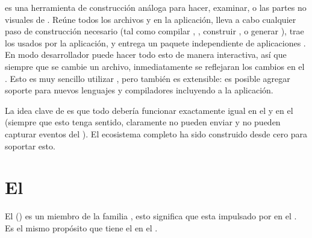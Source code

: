 \begin{itemize}
\commandLinemeteor es una herramienta de construcción análoga para hacer, examinar, o las partes no visuales de \visualstudio. Reúne todos los archivos y \assets en la aplicación, lleva a cabo cualquier paso de construcción necesario (tal como compilar \coffeescript, \minifying \cssNAME, construir \modules \npm, o generar \sourcemaps), trae los \packages usados por la aplicación, y entrega un paquete independiente de aplicaciones \readytorun. En modo desarrollador puede hacer todo esto de manera interactiva, así que siempre que se cambie un archivo, inmediatamente se reflejaran los cambios en el \browser. Esto es muy sencillo utilizar \outofthebox, pero también es extensible: es posible agregar soporte para nuevos lenguajes y compiladores incluyendo \build \plugin \packages a la aplicación.

\end{itemize}

La idea clave de \meteor \package \system es que todo debería funcionar exactamente igual en el \browser y en el \serverAS (siempre que esto tenga sentido, claramente \browsers no pueden enviar \emails y \serversAS no pueden capturar eventos del \mouse). El ecosistema completo ha sido construido desde cero para soportar esto.

\section{El \stack \meteor}


El \stack \meteor() es un miembro de la familia \meanstack, esto significa que esta impulsado por \nodejsNAME en el \serverSide. Es el mismo propósito que tiene el \webserver \apacheNAME en el \stack \lamp.



